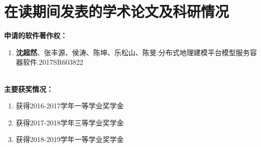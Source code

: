 \chapter{在读期间发表的学术论文及科研情况}

\textbf{申请的软件著作权：}
\begin{enumerate}
    \item \textbf{沈超然}、张丰源、侯涛、陈坤、乐松山、陈旻.分布式地理建模平台模型服务容器软件.2017SR603822
\end{enumerate}

\\

\textbf{主要获奖情况：}
\begin{enumerate}
    \item 获得2016-2017学年一等学业奖学金
    \item 获得2017-2018学年三等学业奖学金
    \item 获得2018-2019学年一等学业奖学金
\end{enumerate}